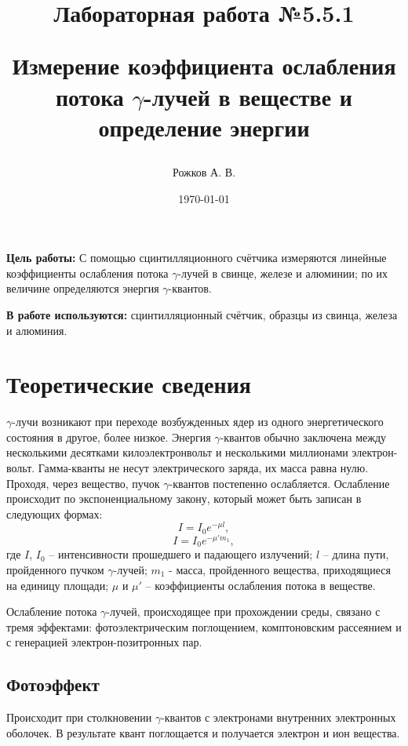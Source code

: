 \documentclass[a4paper, 12pt]{article}
\title{\begin{center}Лабораторная работа №5.5.1\end{center}
Измерение коэффициента ослабления потока $\gamma$-лучей в веществе и определение энергии}
\author{Рожков А. В.}
\date{\today}
\begin{document}
    \maketitle
    \newpage

\textbf{Цель работы:} С помощью сцинтилляционного счётчика измеряются линейные коэффициенты ослабления потока $\gamma$-лучей в свинце, железе и алюминии;
по их величине определяются энергия $\gamma$-квантов.

\textbf{В работе используются:} сцинтилляционный счётчик, образцы из свинца, железа и алюминия.

    \section{Теоретические сведения}
        $\gamma$-лучи возникают при переходе возбужденных ядер из одного энергетического состояния в другое, более низкое. Энергия $\gamma$-квантов обычно заключена между несколькими десятками килоэлектронвольт и несколькими миллионами электрон-вольт. Гамма-кванты не несут электрического заряда, их масса равна нулю. Проходя, через вещество, пучок $\gamma$-квантов постепенно ослабляется. Ослабление происходит по экспоненциальному закону, который может быть записан в следующих формах:
    	\begin{equation}
    		\label{eq1}
    		I = I_0 e^{-\mu l},
    	\end{equation}
        \begin{equation}
    		\label{eq1}
    		I = I_0 e^{-\mu' m_1},
    	\end{equation}
    	где $I$, $I_0$ -- интенсивности прошедшего и падающего излучений; $l$ -- длина пути, пройденного пучком $\gamma$-лучей; $m_1$ - масса, пройденного вещества, приходящиеся на единицу площади; $\mu$ и $\mu'$ -- коэффициенты ослабления потока в веществе.

    	Ослабление потока $\gamma$-лучей, происходящее при прохождении среды, связано с тремя эффектами: фотоэлектрическим поглощением, комптоновским рассеянием и с генерацией электрон-позитронных пар.

        \subsection{Фотоэффект}

            Происходит при столкновении $\gamma$-квантов с электронами внутренних электронных оболочек. В результате квант поглощается и получается электрон и ион вещества.
\end{document}
